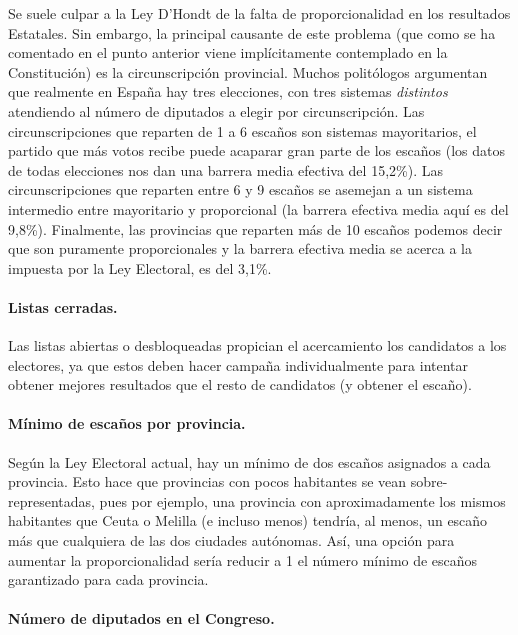 \documentclass[11pt]{article}
\begin{document}
	Se suele culpar a la Ley D'Hondt de la falta de proporcionalidad en los resultados Estatales. Sin embargo, la principal causante de este problema (que como se ha comentado en el punto anterior viene implícitamente contemplado en la Constitución) es la circunscripción provincial. Muchos politólogos argumentan que realmente en España hay tres elecciones, con tres sistemas \textit{distintos} atendiendo al número de diputados a elegir por circunscripción. Las circunscripciones que reparten de 1 a 6 escaños son sistemas mayoritarios, el partido que más votos recibe puede acaparar gran parte de los escaños (los datos de todas elecciones nos dan una barrera media efectiva del 15,2\%). Las circunscripciones que reparten entre 6 y 9 escaños se asemejan a un sistema intermedio entre mayoritario y proporcional (la barrera efectiva media aquí es del 9,8\%). Finalmente, las provincias que reparten más de 10 escaños podemos decir que son puramente proporcionales y la barrera efectiva media se acerca a la impuesta por la Ley Electoral, es del 3,1\%.
	
	\paragraph{Listas cerradas.}
	
	Las listas abiertas o desbloqueadas propician el acercamiento los candidatos a los electores, ya que estos deben hacer campaña individualmente para intentar obtener mejores resultados que el resto de candidatos (y obtener el escaño).
	
	
		\paragraph{Mínimo de escaños por provincia.}
		
		Según la Ley Electoral actual, hay un mínimo de dos escaños asignados a cada provincia. Esto hace que provincias con pocos habitantes se vean sobre-representadas, pues por ejemplo, una provincia con aproximadamente los mismos habitantes que Ceuta o Melilla (e incluso menos) tendría, al menos, un escaño más que cualquiera de las dos ciudades autónomas. Así, una opción para aumentar la proporcionalidad sería reducir a 1 el número mínimo de escaños garantizado para cada provincia.
		
		\paragraph{Número de diputados en el Congreso.}
		
\end{document}
